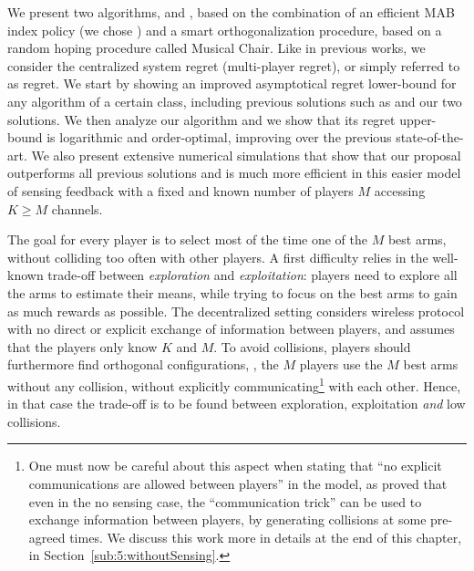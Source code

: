 We present two algorithms, \RandTopM{} and \MCTopM, based on the combination of an efficient MAB index policy (we chose \klUCB) and a smart orthogonalization procedure, based on a random hoping procedure called Musical Chair.
Like in previous works, we consider the centralized system regret (multi-player regret), or simply referred to as regret.
We start by showing an improved asymptotical regret lower-bound for any algorithm of a certain class, including previous solutions such as \rhoRand{} and our two solutions.
We then analyze our \MCTopM{} algorithm and we show that its regret upper-bound is logarithmic and order-optimal, improving over the previous state-of-the-art.
We also present extensive numerical simulations that show that our proposal outperforms all previous solutions and is much more efficient in this easier model of sensing feedback with a fixed and known number of players $M$ accessing $K \geq M$ channels.



The goal for every player is to select most of the time one of the $M$ best arms, without colliding too often with other players.
A first difficulty relies in the well-known trade-off between \emph{exploration} and \emph{exploitation}: players need to explore all the arms to estimate their means, while trying to focus on the best arms to gain as much rewards as possible.
The decentralized setting considers wireless protocol with no direct or explicit exchange of information between players, and assumes that the players only know $K$ and $M$. To avoid collisions, players should furthermore find orthogonal configurations, \ie, the $M$ players use the $M$ best arms without any collision, without explicitly communicating\footnote{One must now be careful about this aspect when stating that ``no explicit communications are allowed between players'' in the model, as \cite{BoursierPerchet18} proved that even in the no sensing case, the ``communication trick'' can be used to exchange information between players, by generating collisions at some pre-agreed times. We discuss this work more in details at the end of this chapter, in Section~\ref{sub:5:withoutSensing}.} with each other.
Hence, in that case the trade-off is to be found between exploration, exploitation \emph{and} low collisions.


